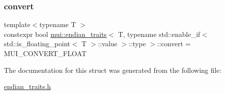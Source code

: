\subsubsection{\texorpdfstring{convert}{convert}}
{\footnotesize\ttfamily template$<$typename T $>$ \\
constexpr bool \hyperlink{structmui_1_1endian__traits}{mui\+::endian\+\_\+traits}$<$ T, typename std\+::enable\+\_\+if$<$ std\+::is\+\_\+floating\+\_\+point$<$ T $>$\+::value $>$\+::type $>$\+::convert = M\+U\+I\+\_\+\+C\+O\+N\+V\+E\+R\+T\+\_\+\+F\+L\+O\+AT\hspace{0.3cm}{\ttfamily [static]}}



The documentation for this struct was generated from the following file\+:\begin{DoxyCompactItemize}
\item 
\hyperlink{endian__traits_8h}{endian\+\_\+traits.\+h}\end{DoxyCompactItemize}

